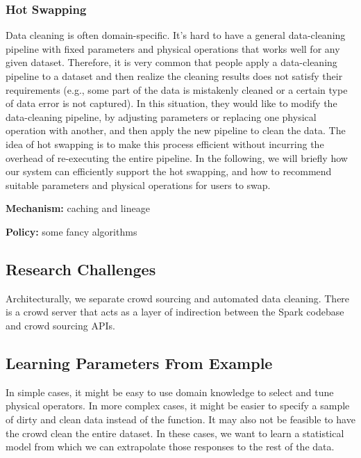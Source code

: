 \subsubsection{Hot Swapping}
Data cleaning is often domain-specific. It's hard to have a general data-cleaning pipeline with fixed parameters and physical operations that works well for any given dataset. Therefore, it is very common that people apply a data-cleaning pipeline to a dataset and then realize the cleaning results does not satisfy their requirements (e.g.,  some part of the data is mistakenly cleaned or a certain type of data error is not captured). In this situation, they would like to modify the data-cleaning pipeline, by adjusting parameters or replacing one physical operation with another, and then apply the new pipeline to clean the data. The idea of hot swapping is to make this process efficient without incurring the overhead of re-executing the entire pipeline. In the following, we will briefly how our system can efficiently support the hot swapping, and how to recommend suitable parameters and physical operations for users to swap. 


\vspace{.5em}

{\noindent \bf Mechanism:} caching and lineage

\vspace{.5em}

{\noindent \bf Policy:} some fancy algorithms





\iffalse
\subsection{Research Challenges}

Architecturally, we separate crowd sourcing and automated data cleaning.
There is a crowd server that acts as a layer of indirection between the Spark codebase and crowd sourcing APIs.




\subsection{Learning Parameters From Example}
In simple cases, it might be easy to use domain knowledge to select and tune physical operators. 
In more complex cases, it might be easier to specify a sample of dirty and clean data instead of the function.
It may also not be feasible to have the crowd clean the entire dataset.
In these cases, we want to learn a statistical model from which we can extrapolate those responses to the rest 
of the data.

